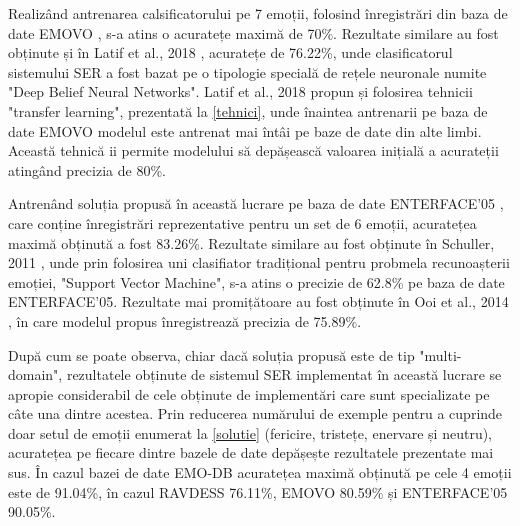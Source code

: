 \documentclass[a4paper,12pt]{book}
\begin{document}
		 Realizând antrenarea calsificatorului pe 7 emoții, folosind înregistrări din baza de date EMOVO \cite{emovo}, s-a atins o acuratețe maximă de 70\%. Rezultate similare au fost obținute și în Latif et al., 2018 \cite{comp5}, acuratețe de 76.22\%, unde clasificatorul sistemului SER a fost bazat pe o tipologie specială de rețele neuronale numite "Deep Belief Neural Networks". Latif et al., 2018 \cite{comp5} propun și folosirea tehnicii "transfer learning", prezentată la \ref{tehnici}, unde înaintea antrenarii pe baza de date EMOVO modelul este antrenat mai întâi pe baze de date din alte limbi. Această tehnică ii permite modelului să depășească valoarea inițială a acurateții atingând precizia de 80\%. \par 
		 Antrenând soluția propusă în această lucrare pe baza de date ENTERFACE'05 \cite{enterface}, care conține înregistrări reprezentative pentru un set de 6 emoții, acuratețea maximă obținută a fost 83.26\%. Rezultate similare au fost obținute în Schuller, 2011 \cite{comp6}, unde prin folosirea uni clasifiator tradițional pentru probmela recunoașterii emoției, "Support Vector Machine", s-a atins o precizie de 62.8\% pe baza de date ENTERFACE'05. Rezultate mai promițătoare au fost obținute în Ooi et al., 2014 \cite{comp7}, în care modelul propus înregistrează precizia de 75.89\%. \par
		 După cum se poate observa, chiar dacă soluția propusă este de tip "multi-domain", rezultatele obținute de sistemul SER implementat în această lucrare se apropie considerabil de cele obținute de implementări care sunt specializate pe câte una dintre acestea. Prin reducerea numărului de exemple pentru a cuprinde doar setul de emoții enumerat la \ref{solutie} (fericire, tristețe, enervare și neutru), acuratețea pe fiecare dintre bazele de date depășește rezultatele prezentate mai sus. În cazul bazei de date EMO-DB acuratețea maximă obținută pe cele 4 emoții este de 91.04\%, în cazul RAVDESS 76.11\%, EMOVO 80.59\% și ENTERFACE'05 90.05\%.  
		 
\end{document}
